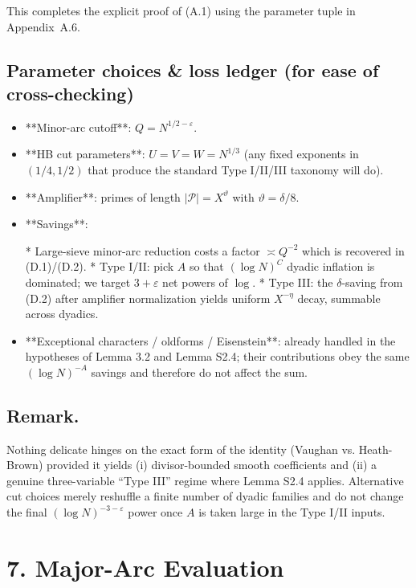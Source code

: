 \documentclass[11pt]{article}
\theoremstyle{definition}
\theoremstyle{remark}
\begin{document}
This completes the explicit proof of (A.1) using the parameter tuple in Appendix~A.6.

\subsection*{Parameter choices \& loss ledger (for ease of cross-checking)}

\begin{itemize}
	\item **Minor-arc cutoff**: $Q=N^{1/2-\varepsilon}$.
	\item **HB cut parameters**: $U=V=W=N^{1/3}$ (any fixed exponents in $(1/4,1/2)$ that produce the standard Type I/II/III taxonomy will do).
	\item **Amplifier**: primes of length $|\mathcal P|=X^\vartheta$ with $\vartheta=\delta/8$.
	\item **Savings**:

	      * Large-sieve minor-arc reduction costs a factor $\asymp Q^{-2}$ which is recovered in (D.1)/(D.2).
	      * Type I/II: pick $A$ so that $(\log N)^C$ dyadic inflation is dominated; we target $3+\varepsilon$ net powers of $\log$.
	      * Type III: the $\delta$-saving from (D.2) after amplifier normalization yields uniform $X^{-\eta}$ decay, summable across dyadics.
	\item **Exceptional characters / oldforms / Eisenstein**: already handled in the hypotheses of Lemma 3.2 and Lemma S2.4; their contributions obey the same $(\log N)^{-A}$ savings and therefore do not affect the sum.
\end{itemize}

\subsection*{Remark.}

Nothing delicate hinges on the exact form of the identity (Vaughan vs. Heath-Brown) provided it yields (i) divisor-bounded smooth coefficients and (ii) a genuine three-variable “Type III” regime where Lemma S2.4 applies. Alternative cut choices merely reshuffle a finite number of dyadic families and do not change the final $(\log N)^{-3-\varepsilon}$ power once $A$ is taken large in the Type I/II inputs.

\section*{7. Major-Arc Evaluation}
\end{document}
